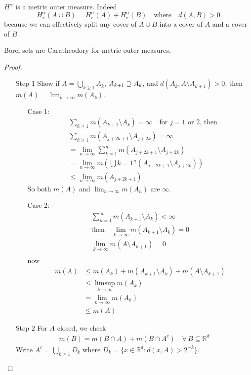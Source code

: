 \begin{example}
	$H^{\alpha}$ is a metric outer measure. Indeed
	\[
		H_{r}^{\alpha}(A \cup B) = H_{r}^{\alpha}(A) + H_{r}^{\alpha}(B) \quad \text{where} \quad d(A,B) > 0
	\]
	because we can effectively split any cover of $A \cup B$ into a cover of $A$ and a cover of $B$.
\end{example}

\begin{lemma}
	Borel sets are Caratheodory for metric outer measures.
\end{lemma}

\begin{proof} \hfill
	\begin{enumerate}
		\item[Step 1] Show if $A = \bigcup_{k \geq 1} A_k$, $A_{k+1} \supseteq A_k$,
			and $d(A_k, A \setminus A_{k+1}) >0$, then $m(A) = \lim_{k \to \infty} m(A_k)$.
			\begin{enumerate}
				\item[Case 1:]
					\begin{align*}
					&\sum_{k \geq 1} m(A_{k+1} \setminus A_k) = \infty \quad \text{for $j=1$ or $2$, then}\\
					&\sum_{k \geq 1} m(A_{j+2k+1} \setminus A_{j + 2k})  = \infty \\
					& = \lim_{n \to \infty} \sum_{k = 1}^{n} m(A_{j+2k+1} \setminus A_{j + 2k}) \\
					& = \lim_{n \to \infty} m(\bigcup{k = 1}^{n} (A_{j+2k+1} \setminus A_{j + 2k})) \\
					& \leq \lim_{n \to \infty} m(A_{j+2k+1})
					\end{align*}
					So both $m(A)$ and $\lim_{n \to \infty} m(A_n)$ are $\infty$.

				\item[Case 2:]
					\begin{align*}
						\sum_{n=1}^{\infty} m(A_{k+1} \setminus A_{k}) < \infty \\
					\text{then} \quad \lim_{k \to \infty}  m(A_{k+1} \setminus A_{k}) = 0\\
					\lim_{k \to \infty}  m(A \setminus A_{k+1}) = 0\\
					\end{align*} now
					\begin{align*}
						m(A) &\leq m(A_{k}) + m(A_{k+1} \setminus A_{k}) + m(A \setminus A_{k+1}) \\
							 &\leq \limsup_{k \to \infty} m(A_{k}) \\
							 &= \lim_{k \to \infty} m(A_{k}) \\
							 &\leq m(A)
					\end{align*}
			\end{enumerate}
		\item[Step 2] For $A$ closed, we check
			\begin{align*}
			m(B) = m(B \cap A) + m(B \cap A^{c}) \quad \forall \, B \subseteq \mathbb{R}^d
			\end{align*}
			Write $A^{c} = \bigcup_{k \geq 1} D_k$ where $D_{k} = \{x \in \mathbb{R}^d : d(x,A) > 2^{-k} \}$.


\end{enumerate}
\end{proof}
